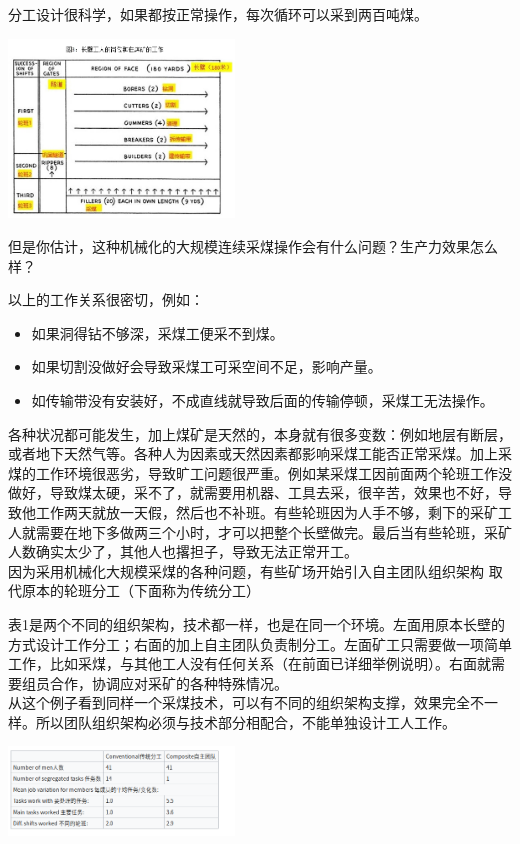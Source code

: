 分工设计很科学，如果都按正常操作，每次循环可以采到两百吨煤。


\includegraphics[width=6cm]{长壁11.jpg}

但是你估计，这种机械化的大规模连续采煤操作会有什么问题？生产力效果怎么样？

以上的工作关系很密切，例如：

\begin{itemize}
\tightlist
\item
  如果洞得钻不够深，采煤工便采不到煤。
\item
  如果切割没做好会导致采煤工可采空间不足，影响产量。
\item
  如传输带没有安装好，不成直线就导致后面的传输停顿，采煤工无法操作。
\end{itemize}

各种状况都可能发生，加上煤矿是天然的，本身就有很多变数：例如地层有断层，或者地下天然气等。各种人为因素或天然因素都影响采煤工能否正常采煤。加上采煤的工作环境很恶劣，导致旷工问题很严重。例如某采煤工因前面两个轮班工作没做好，导致煤太硬，采不了，就需要用机器、工具去采，很辛苦，效果也不好，导致他工作两天就放一天假，然后也不补班。有些轮班因为人手不够，剩下的采矿工人就需要在地下多做两三个小时，才可以把整个长壁做完。最后当有些轮班，采矿人数确实太少了，其他人也撂担子，导致无法正常开工。\\
因为采用机械化大规模采煤的各种问题，有些矿场开始引入自主团队组织架构
取代原本的轮班分工（下面称为传统分工）

表1是两个不同的组织架构，技术都一样，也是在同一个环境。左面用原本长壁的方式设计工作分工；右面的加上自主团队负责制分工。左面矿工只需要做一项简单工作，比如采煤，与其他工人没有任何关系（在前面已详细举例说明）。右面就需要组员合作，协调应对采矿的各种特殊情况。\\
从这个例子看到同样一个采煤技术，可以有不同的组织架构支撑，效果完全不一样。所以团队组织架构必须与技术部分相配合，不能单独设计工人工作。

\includegraphics[width=6cm]{Screenshotfrom2023-11-0303-25-17.png}

